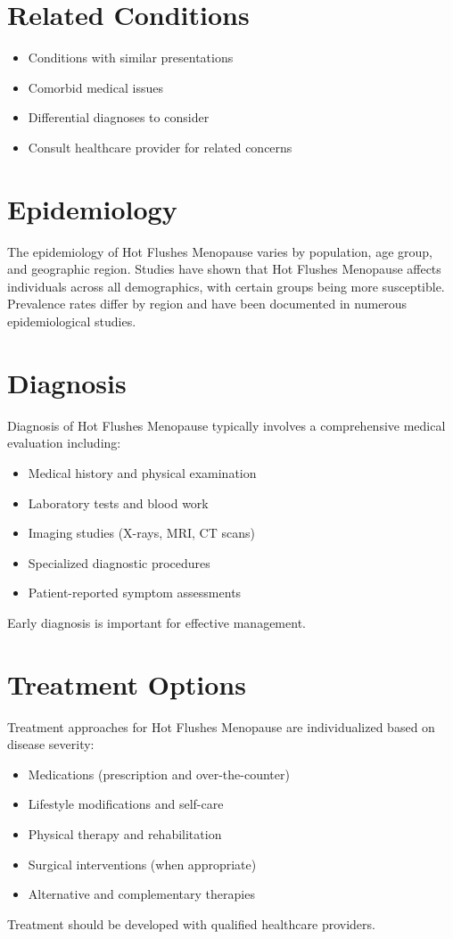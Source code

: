 \section*{Related Conditions}
\begin{itemize}
  \item Conditions with similar presentations
  \item Comorbid medical issues
  \item Differential diagnoses to consider
  \item Consult healthcare provider for related concerns
\end{itemize}

\section*{Epidemiology}
The epidemiology of Hot Flushes Menopause varies by population, age group, and geographic region. Studies have shown that Hot Flushes Menopause affects individuals across all demographics, with certain groups being more susceptible. Prevalence rates differ by region and have been documented in numerous epidemiological studies.

\section*{Diagnosis}
Diagnosis of Hot Flushes Menopause typically involves a comprehensive medical evaluation including:
\begin{itemize}
  \item Medical history and physical examination
  \item Laboratory tests and blood work
  \item Imaging studies (X-rays, MRI, CT scans)
  \item Specialized diagnostic procedures
  \item Patient-reported symptom assessments
\end{itemize}
Early diagnosis is important for effective management.

\section*{Treatment Options}
Treatment approaches for Hot Flushes Menopause are individualized based on disease severity:
\begin{itemize}
  \item Medications (prescription and over-the-counter)
  \item Lifestyle modifications and self-care
  \item Physical therapy and rehabilitation
  \item Surgical interventions (when appropriate)
  \item Alternative and complementary therapies
\end{itemize}
Treatment should be developed with qualified healthcare providers.

